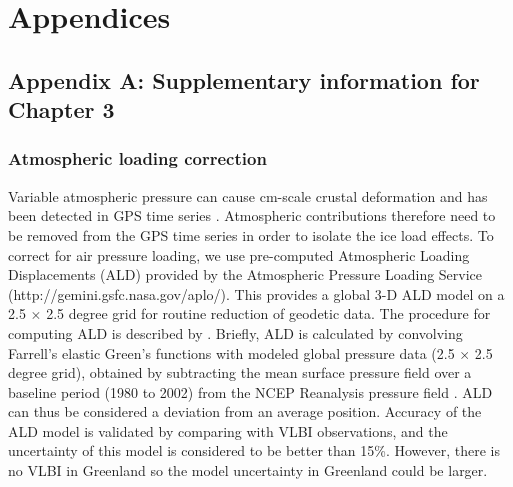 \chapter*{Appendices}
\setcounter{figure}{0}
\setcounter{equation}{0}
\setcounter{table}{0}
\renewcommand{\thefigure}{A\arabic{figure}}
\renewcommand{\theequation}{A\arabic{equation}}
\renewcommand{\thetable}{A\arabic{table}}


\newpage
\section*{Appendix A: Supplementary information for Chapter 3}
\subsection*{Atmospheric loading correction}
Variable atmospheric pressure can cause cm-scale crustal deformation \cite[]{magie1969source,darwin1882xlvi,petrov2004study} and has been detected in GPS time series \cite[]{vandam1994atmospheric,dong2002anatomy}.  Atmospheric contributions therefore need to be removed from the GPS time series in order to isolate the ice load effects.  To correct for air pressure loading, we use pre-computed Atmospheric Loading Displacements (ALD) provided by the Atmospheric Pressure Loading Service (http://gemini.gsfc.nasa.gov/aplo/).  This provides a global 3-D ALD model on a 2.5 $\times$ 2.5 degree grid for routine reduction of geodetic data.  The procedure for computing ALD is described by \citet{petrov2004study}.  Briefly, ALD is calculated by convolving Farrell’s elastic Green’s functions \cite[]{farrell1972deformation} with modeled global pressure data (2.5 $\times$ 2.5 degree grid), obtained by subtracting the mean surface pressure field over a baseline period (1980 to 2002) from the NCEP Reanalysis pressure field \cite[]{kalnay1996ncep}.  ALD can thus be considered a deviation from an average position. Accuracy of the ALD model is validated by comparing with VLBI observations, and the uncertainty of this model is considered to be better than 15\%.  However, there is no VLBI in Greenland so the model uncertainty in Greenland could be larger.

